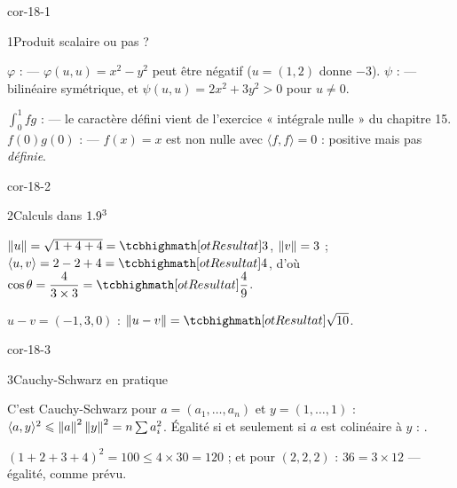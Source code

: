 
\corrigesSouples

\begin{blocLivre}{cor-18-1}
\begin{corrige}{1}{Produit scalaire ou pas ?}
\begin{questions}
  \item $\varphi$ :  — $\varphi(u,u)=x^{2}-y^{2}$ peut
    être négatif ($u=(1,2)$ donne $-3$). $\psi$ :  —
    bilinéaire symétrique, et $\psi(u,u)=2x^{2}+3y^{2}>0$ pour $u\neq0$.
  \item $\int_0^1fg$ :  — le caractère défini vient de
    l'exercice « intégrale nulle » du chapitre 15. $f(0)g(0)$ :
     — $f(x)=x$ est non nulle avec
    $\langle f,f\rangle=0$ : positive mais pas \emph{définie}.
\end{questions}
\end{corrige}
\end{blocLivre}

\begin{blocLivre}{cor-18-2}
\begin{corrige}{2}{Calculs dans $1.9^{3}$}
\begin{questions}
  \item $\norme{u}=\sqrt{1+4+4}=\res{3}$, $\left\lVert v\right\rVert=3$ ;
    $\langle u,v\rangle=2-2+4=\res{4}$, d'où
    $\cos\theta=\dfrac{4}{3\times3}=\res{\dfrac49}$.
  \item $u-v=(-1,3,0)$ : $\norme{u-v}=\res{\sqrt{10}}$.
\end{questions}
\end{corrige}
\end{blocLivre}

\begin{blocLivre}{cor-18-3}
\begin{corrige}{3}{Cauchy-Schwarz en pratique}
\begin{questions}
  \item C'est Cauchy-Schwarz pour $a=(a_1,\dots,a_n)$ et
    $y=(1,\dots,1)$ :
    $\langle a,y\rangle^{2}\leqslant\left\lVert a\right\rVert^{2}\left\lVert y\right\rVert^{2}
    =n\sum a_i^{2}$. Égalité si et seulement si $a$ est colinéaire à
    $y$ : .
  \item $(1+2+3+4)^{2}=100\leqslant4\times30=120$ ; et pour $(2,2,2)$ :
    $36=3\times12$ — égalité, comme prévu.
\end{questions}
\end{corrige}
\end{blocLivre}

